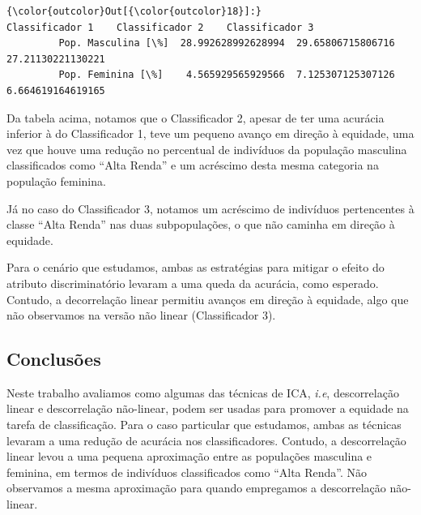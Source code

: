 \documentclass[11pt]{article}
\begin{document}
\begin{Verbatim}[commandchars=\\\{\}]
{\color{outcolor}Out[{\color{outcolor}18}]:}                        Classificador 1    Classificador 2    Classificador 3
         Pop. Masculina [\%]  28.992628992628994  29.65806715806716  27.21130221130221
         Pop. Feminina [\%]    4.565929565929566  7.125307125307126  6.664619164619165
\end{Verbatim}
            
    Da tabela acima, notamos que o Classificador 2, apesar de ter uma
acurácia inferior à do Classificador 1, teve um pequeno avanço em
direção à equidade, uma vez que houve uma redução no percentual de
indivíduos da população masculina classificados como ``Alta Renda'' e um
acréscimo desta mesma categoria na população feminina.

Já no caso do Classificador 3, notamos um acréscimo de indivíduos
pertencentes à classe ``Alta Renda'' nas duas subpopulações, o que não
caminha em direção à equidade.

Para o cenário que estudamos, ambas as estratégias para mitigar o efeito
do atributo discriminatório levaram a uma queda da acurácia, como
esperado. Contudo, a decorrelação linear permitiu avanços em direção à
equidade, algo que não observamos na versão não linear (Classificador
3).

    \hypertarget{conclusuxf5es}{%
\subsection{Conclusões}\label{conclusuxf5es}}

Neste trabalho avaliamos como algumas das técnicas de ICA, \emph{i.e},
descorrelação linear e descorrelação não-linear, podem ser usadas para
promover a equidade na tarefa de classificação. Para o caso particular
que estudamos, ambas as técnicas levaram a uma redução de acurácia nos
classificadores. Contudo, a descorrelação linear levou a uma pequena
aproximação entre as populações masculina e feminina, em termos de
indivíduos classificados como ``Alta Renda''. Não observamos a mesma
aproximação para quando empregamos a descorrelação não-linear.


    
    



    
    
\end{document}
